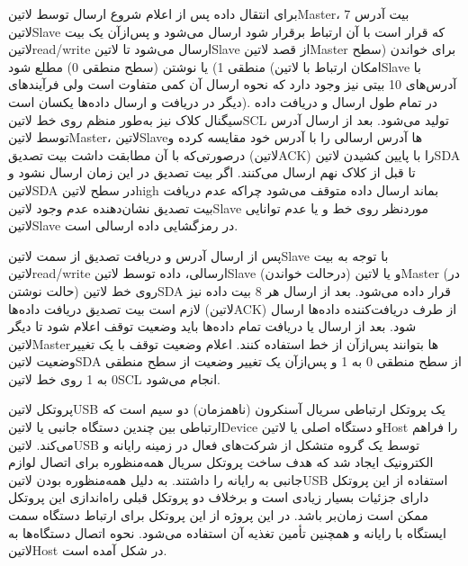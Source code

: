 برای انتقال داده پس از اعلام شروع ارسال توسط ‌لاتین{Master}، 7 بیت آدرس ‌لاتین{Slave} که قرار است با آن ارتباط برقرار شود ارسال می‌شود و پس‌ازآن یک بیت ‌لاتین{read/write} ارسال می‌شود تا ‌لاتین{Slave} از قصد ‌لاتین{Master} برای خواندن (سطح منطقی 1) یا نوشتن (سطح منطقی 0) مطلع شود (امکان ارتباط با ‌لاتین{Slave} با آدرس‌های 10 بیتی نیز وجود دارد که نحوه ارسال آن کمی متفاوت است ولی فرآیندهای دیگر در دریافت و ارسال داده‌ها یکسان است). در تمام طول ارسال و دریافت داده سیگنال کلاک نیز به‌طور منظم روی خط ‌لاتین{SCL} تولید می‌شود. بعد از ارسال آدرس توسط ‌لاتین{Master}، ‌لاتین{Slave}ها آدرس ارسالی را با آدرس خود مقایسه کرده و درصورتی‌که با آن مطابقت داشت بیت تصدیق (‌لاتین{ACK}) را با پایین کشیدن ‌لاتین{SDA} تا قبل از کلاک نهم ارسال می‌کنند. اگر بیت تصدیق در این زمان ارسال نشود و ‌لاتین{SDA} در سطح ‌لاتین{high} بماند ارسال داده متوقف می‌شود چراکه عدم دریافت بیت تصدیق نشان‌دهنده عدم وجود ‌لاتین{Slave} موردنظر روی خط و یا عدم توانایی ‌لاتین{Slave} در رمزگشایی داده ارسالی است. 

پس از ارسال آدرس و دریافت تصدیق از سمت ‌لاتین{Slave} با توجه به بیت ‌لاتین{read/write} ارسالی، داده توسط ‌لاتین{Slave} (درحالت خواندن) و یا ‌لاتین{Master} (در حالت نوشتن) روی خط ‌لاتین{SDA} قرار داده می‌شود. بعد از ارسال هر 8 بیت داده نیز لازم است بیت تصدیق دریافت داده‌ها (‌لاتین{ACK}) از طرف دریافت‌کننده داده‌ها ارسال شود. بعد از ارسال یا دریافت تمام داده‌ها باید وضعیت توقف اعلام شود تا دیگر ‌لاتین{Master}ها بتوانند پس‌ازآن از خط استفاده کنند. اعلام وضعیت توقف با یک تغییر وضعیت ‌لاتین{SDA} از سطح منطقی 0 به 1 و پس‌ازآن یک تغییر وضعیت از سطح منطقی 0 به 1  روی خط ‌لاتین{SCL} انجام می‌شود.

\label{sec:usb}

پروتکل ‌لاتین{USB} یک پروتکل ارتباطی سریال آسنکرون (ناهمزمان) دو سیم است که ارتباطی بین چندین دستگاه جانبی یا ‌لاتین{Device} و دستگاه اصلی یا ‌لاتین{Host} را فراهم می‌کند. ‌لاتین{USB} توسط یک گروه متشکل از شرکت‌های فعال در زمینه رایانه و الکترونیک ایجاد شد که هدف ساخت پروتکل سریال همه‌منظوره برای اتصال لوازم جانبی به رایانه را داشتند. به دلیل همه‌منظوره بودن ‌لاتین{USB} استفاده از این پروتکل دارای جزئیات بسیار زیادی است و برخلاف دو پروتکل قبلی راه‌اندازی این پروتکل ممکن است زمان‌بر باشد. در این پروژه از این پروتکل برای ارتباط دستگاه سمت ایستگاه با رایانه و همچنین تأمین تغذیه آن استفاده می‌شود. نحوه اتصال دستگاه‌ها به ‌لاتین{Host} در شکل  آمده است.

